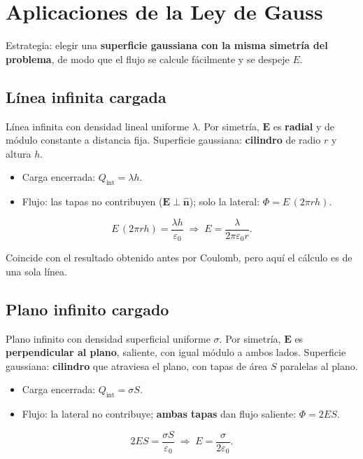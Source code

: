 \documentclass[12pt,a4paper]{article}
\begin{document}
\section{Aplicaciones de la Ley de Gauss}

Estrategia: elegir una \textbf{superficie gaussiana con la misma
simetría del problema}, de modo que el flujo se calcule fácilmente y
se despeje $E$.

\subsection{Línea infinita cargada}

Línea infinita con densidad lineal uniforme $\lambda$. Por simetría,
$\mathbf{E}$ es \textbf{radial} y de módulo constante a distancia fija.
Superficie gaussiana: \textbf{cilindro} de radio $r$ y altura $h$.

\begin{itemize}[nosep]
  \item Carga encerrada: $Q_{\text{int}} = \lambda h$.
  \item Flujo: las tapas no contribuyen
        ($\mathbf{E}\perp\hat{\mathbf{n}}$); solo la lateral:
        $\Phi = E\,(2\pi r h)$.
\end{itemize}
\[
E\,(2\pi r h) = \frac{\lambda h}{\varepsilon_0}
\;\Longrightarrow\;
\boxed{E = \frac{\lambda}{2\pi\varepsilon_0 r}} .
\]

Coincide con el resultado obtenido antes por Coulomb, pero aquí el
cálculo es de una sola línea.

\subsection{Plano infinito cargado}

Plano infinito con densidad superficial uniforme $\sigma$. Por
simetría, $\mathbf{E}$ es \textbf{perpendicular al plano}, saliente,
con igual módulo a ambos lados. Superficie gaussiana: \textbf{cilindro}
que atraviesa el plano, con tapas de área $S$ paralelas al plano.

\begin{itemize}[nosep]
  \item Carga encerrada: $Q_{\text{int}} = \sigma S$.
  \item Flujo: la lateral no contribuye; \textbf{ambas tapas} dan
        flujo saliente: $\Phi = 2 E S$.
\end{itemize}
\[
2 E S = \frac{\sigma S}{\varepsilon_0}
\;\Longrightarrow\;
\boxed{E = \frac{\sigma}{2\varepsilon_0}} .
\]
\end{document}
